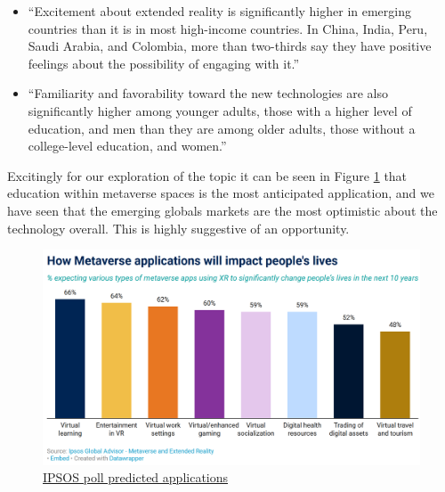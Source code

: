 \begin{itemize}
\item ``Excitement about extended reality is significantly higher in emerging countries than it is in most high-income countries. In China, India, Peru, Saudi Arabia, and Colombia, more than two-thirds say they have positive feelings about the possibility of engaging with it.''
\item ``Familiarity and favorability toward the new technologies are also significantly higher among younger adults, those with a higher level of education, and men than they are among older adults, those without a college-level education, and women.''
\end{itemize}

Excitingly for our exploration of the topic it can be seen in Figure \ref{fig:applications} that education within metaverse spaces is the most anticipated application, and we have seen that the emerging globals markets are the most optimistic about the technology overall. This is highly suggestive of an opportunity.



\begin{figure}[ht]\centering %
	\includegraphics{applications}
	\caption{\href{https://www.ipsos.com/en/global-advisor-metaverse-extended-reality-may-2022}{IPSOS poll predicted applications}}
	\label{fig:applications}
\end{figure}

